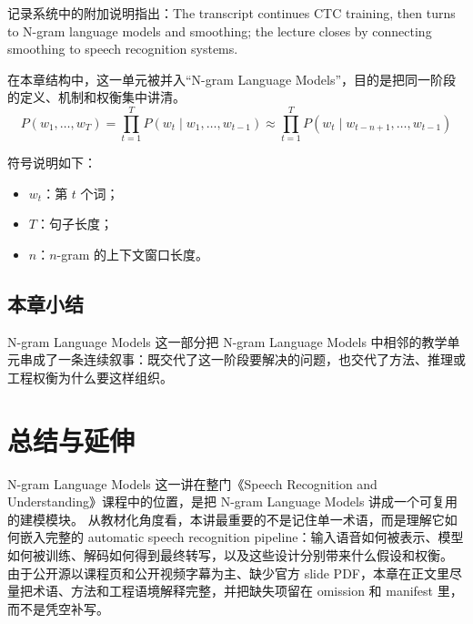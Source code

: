 \documentclass[a4paper]{article}
\begin{document}
记录系统中的附加说明指出：The transcript continues CTC training, then turns to N-gram language models and smoothing; the lecture closes by connecting smoothing to speech recognition systems.

在本章结构中，这一单元被并入“N-gram Language Models”，目的是把同一阶段的定义、机制和权衡集中讲清。
\[
P(w_1,\dots,w_T) = \prod_{t=1}^{T} P(w_t \mid w_1,\dots,w_{t-1}) \approx \prod_{t=1}^{T} P(w_t \mid w_{t-n+1},\dots,w_{t-1})
\]

符号说明如下：
\begin{itemize}
\item $w_t$：第 $t$ 个词；
\item $T$：句子长度；
\item $n$：$n$-gram 的上下文窗口长度。
\end{itemize}

\subsection{本章小结}
N-gram Language Models 这一部分把 N-gram Language Models 中相邻的教学单元串成了一条连续叙事：既交代了这一阶段要解决的问题，也交代了方法、推理或工程权衡为什么要这样组织。

\section{总结与延伸}
N-gram Language Models 这一讲在整门《Speech Recognition and Understanding》课程中的位置，是把 N-gram Language Models 讲成一个可复用的建模模块。
从教材化角度看，本讲最重要的不是记住单一术语，而是理解它如何嵌入完整的 automatic speech recognition pipeline：输入语音如何被表示、模型如何被训练、解码如何得到最终转写，以及这些设计分别带来什么假设和权衡。
由于公开源以课程页和公开视频字幕为主、缺少官方 slide PDF，本章在正文里尽量把术语、方法和工程语境解释完整，并把缺失项留在 omission 和 manifest 里，而不是凭空补写。
\end{document}
